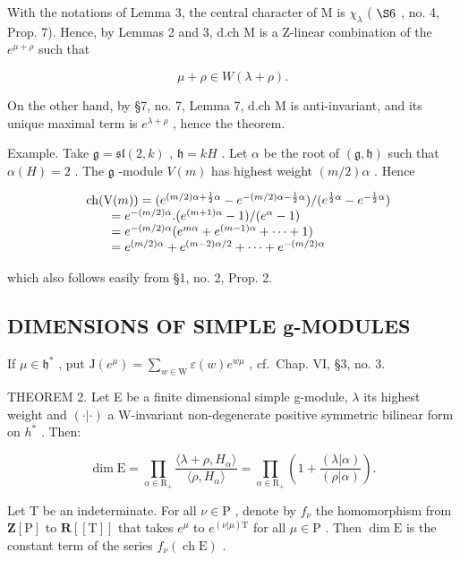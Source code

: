 With the notations of Lemma 3, the central character of M is \(\chi_{\lambda}\) ( \(\S6\) , no. 4, Prop. 7). Hence, by Lemmas 2 and 3, d.ch M is a Z-linear combination of the \(e^{\mu+\rho}\) such that

\[
\mu + \rho \in W (\lambda + \rho).
\]

On the other hand, by §7, no. 7, Lemma 7, d.ch M is anti-invariant, and its unique maximal term is \(e^{\lambda+\rho}\) , hence the theorem.

Example. Take \(\mathfrak{g} = \mathfrak{sl}(2,k)\) , \(\mathfrak{h} = kH\) . Let \(\alpha\) be the root of \((\mathfrak{g},\mathfrak{h})\) such that \(\alpha (H) = 2\) . The \(\mathfrak{g}\) -module \(V(m)\) has highest weight \((m / 2)\alpha\) . Hence

\[
\begin{array}{r l} & {\mathrm{ch} (\mathrm{V} (m)) = (e ^ {(m / 2) \alpha + \frac {1}{2} \alpha} - e ^ {- (m / 2) \alpha - \frac {1}{2} \alpha}) / (e ^ {\frac {1}{2} \alpha} - e ^ {- \frac {1}{2} \alpha})} \\ & {\qquad = e ^ {- (m / 2) \alpha}. (e ^ {(m + 1) \alpha} - 1) / (e ^ {\alpha} - 1)} \\ & {\qquad = e ^ {- (m / 2) \alpha} (e ^ {m \alpha} + e ^ {(m - 1) \alpha} + \dots + 1)} \\ & {\qquad = e ^ {(m / 2) \alpha} + e ^ {(m - 2) \alpha / 2} + \dots + e ^ {- (m / 2) \alpha}} \end{array}
\]

which also follows easily from §1, no. 2, Prop. 2.

\subsection{DIMENSIONS OF SIMPLE g-MODULES}

If \(\mu \in \mathfrak{h}^*\) , put \(\mathrm{J}(e^{\mu}) = \sum_{w\in \mathrm{W}}\varepsilon (w)e^{w\mu}\) , cf.~Chap. VI, §3, no. 3.

THEOREM 2. Let E be a finite dimensional simple g-module, \(\lambda\) its highest weight and \((\cdot|\cdot)\) a W-invariant non-degenerate positive symmetric bilinear form on \(h^{*}\) . Then:

\[
\dim \mathrm{E} = \prod_ {\alpha \in \mathrm{R} _ {+}} \frac {\langle \lambda + \rho , H _ {\alpha} \rangle}{\langle \rho , H _ {\alpha} \rangle} = \prod_ {\alpha \in \mathrm{R} _ {+}} \left(1 + \frac {(\lambda | \alpha)}{(\rho | \alpha)}\right).
\]

Let \(\mathrm{T}\) be an indeterminate. For all \(\nu \in \mathrm{P}\) , denote by \(f_{\nu}\) the homomorphism from \(\mathbf{Z}[\mathrm{P}]\) to \(\mathbf{R}[[\mathrm{T}]]\) that takes \(e^{\mu}\) to \(e^{(\nu |\mu)\mathrm{T}}\) for all \(\mu \in \mathrm{P}\) . Then \(\dim \mathrm{E}\) is the constant term of the series \(f_{\nu}(\operatorname{ch}\mathrm{E})\) .

